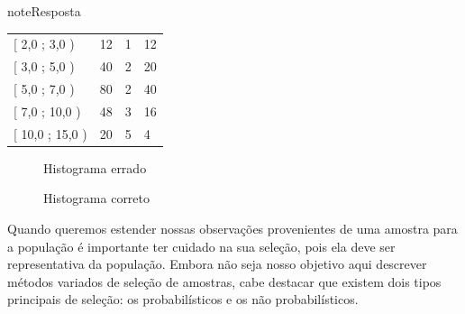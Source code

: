 \begin{sphinxadmonition}{note}{Resposta}


\begin{savenotes}\sphinxattablestart
\centering
\begin{tabulary}{\linewidth}[t]{|T|T|T|T|}
\hline
{}\relax &\relax &\relax &\relax \\
\hline
{[} 2,0 ; 3,0 )
&
12
&
1
&
12
\\
\hline
{[} 3,0 ; 5,0 )
&
40
&
2
&
20
\\
\hline
{[} 5,0 ; 7,0 )
&
80
&
2
&
40
\\
\hline
{[} 7,0 ; 10,0 )
&
48
&
3
&
16
\\
\hline
{[} 10,0 ; 15,0 )
&
20
&
5
&
4
\\
\hline
\end{tabulary}
\par
\sphinxattableend\end{savenotes}
\end{sphinxadmonition}

\begin{figure}[H]
\centering
\capstart

\noindent{}
\caption{Histograma errado}\label{\detokenize{PE103-5:id5}}\label{\detokenize{PE103-5:id11}}\end{figure}

\begin{figure}[H]
\centering
\capstart

\noindent{}
\caption{Histograma correto}\label{\detokenize{PE103-5:id6}}\label{\detokenize{PE103-5:id12}}\end{figure}


\label{\detokenize{PE103-A::doc}}\label{\detokenize{PE103-A:para-saber-mais}}


\label{\detokenize{PE103-A:a-questao-da-selecao-de-amostras}}\label{\detokenize{PE103-A:sec-coloque-aqui-o-nome}}
Quando queremos estender nossas observações provenientes de uma amostra para a população é importante ter cuidado na sua seleção, pois ela deve ser representativa da população. Embora não seja nosso objetivo aqui descrever métodos variados de seleção de amostras, cabe destacar que existem dois tipos principais de seleção: os probabilísticos e os não probabilísticos.

